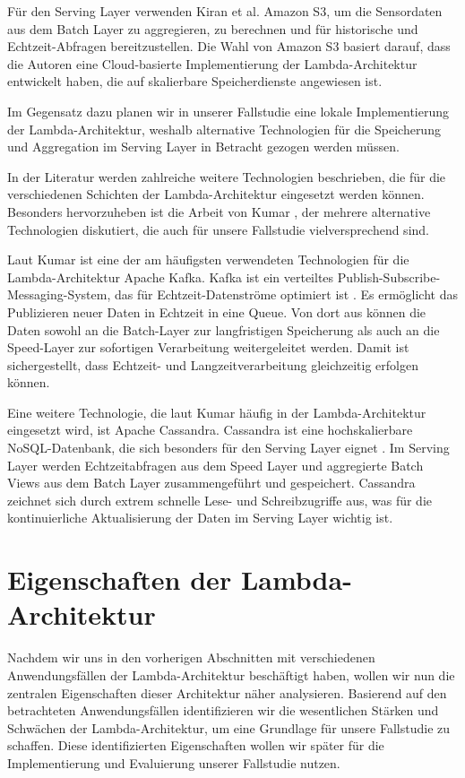 Für den Serving Layer verwenden Kiran et al. \cite{kiran2015lambda} Amazon S3, um die Sensordaten aus dem Batch Layer zu aggregieren, zu berechnen und für historische und Echtzeit-Abfragen bereitzustellen. Die Wahl von Amazon S3 basiert darauf, dass die Autoren eine Cloud-basierte Implementierung der Lambda-Architektur entwickelt haben, die auf skalierbare Speicherdienste angewiesen ist.

Im Gegensatz dazu planen wir in unserer Fallstudie eine lokale Implementierung der Lambda-Architektur, weshalb alternative Technologien für die Speicherung und Aggregation im Serving Layer in Betracht gezogen werden müssen.

In der Literatur werden zahlreiche weitere Technologien beschrieben, die für die verschiedenen Schichten der Lambda-Architektur eingesetzt werden können. Besonders hervorzuheben ist die Arbeit von Kumar \cite{kumar2020lambda}, der mehrere alternative Technologien diskutiert, die auch für unsere Fallstudie vielversprechend sind.

Laut Kumar \cite{kumar2020lambda} ist eine der am häufigsten verwendeten Technologien für die Lambda-Architektur Apache Kafka. Kafka ist ein verteiltes Publish-Subscribe-Messaging-System, das für Echtzeit-Datenströme optimiert ist \cite{kreps2011kafka}. Es ermöglicht das Publizieren neuer Daten in Echtzeit in eine Queue. Von dort aus können die Daten sowohl an die Batch-Layer zur langfristigen Speicherung als auch an die Speed-Layer zur sofortigen Verarbeitung weitergeleitet werden. Damit ist sichergestellt, dass Echtzeit- und Langzeitverarbeitung gleichzeitig erfolgen können.

Eine weitere Technologie, die laut Kumar \cite{kumar2020lambda} häufig in der Lambda-Architektur eingesetzt wird, ist Apache Cassandra. Cassandra ist eine hochskalierbare NoSQL-Datenbank, die sich besonders für den Serving Layer eignet \cite{warren2015big}. Im Serving Layer werden Echtzeitabfragen aus dem Speed Layer und aggregierte Batch Views aus dem Batch Layer zusammengeführt und gespeichert. Cassandra zeichnet sich durch extrem schnelle Lese- und Schreibzugriffe aus, was für die kontinuierliche Aktualisierung der Daten im Serving Layer wichtig ist.

\section{Eigenschaften der Lambda-Architektur}
Nachdem wir uns in den vorherigen Abschnitten mit verschiedenen Anwendungsfällen der Lambda-Architektur beschäftigt haben, wollen wir nun die zentralen Eigenschaften dieser Architektur näher analysieren. Basierend auf den betrachteten Anwendungsfällen identifizieren wir die wesentlichen Stärken und Schwächen der Lambda-Architektur, um eine Grundlage für unsere Fallstudie zu schaffen. Diese identifizierten Eigenschaften wollen wir später für die Implementierung und Evaluierung unserer Fallstudie nutzen.

